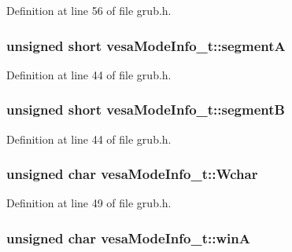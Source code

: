 Definition at line 56 of file grub.\+h.

\hypertarget{structvesaModeInfo__t_af83d59348e11c50399f088cea83fb0a9}{
\subsubsection[{segment\+A}]{\setlength{\rightskip}{0pt plus 5cm}unsigned short vesa\+Mode\+Info\+\_\+t\+::segment\+A}}\label{structvesaModeInfo__t_af83d59348e11c50399f088cea83fb0a9}


Definition at line 44 of file grub.\+h.

\hypertarget{structvesaModeInfo__t_a3f8f6fe3c4ee7fdbca2cf15883db343f}{
\subsubsection[{segment\+B}]{\setlength{\rightskip}{0pt plus 5cm}unsigned short vesa\+Mode\+Info\+\_\+t\+::segment\+B}}\label{structvesaModeInfo__t_a3f8f6fe3c4ee7fdbca2cf15883db343f}


Definition at line 44 of file grub.\+h.

\hypertarget{structvesaModeInfo__t_a154546a781d9a7d5da7cc0b77a7b998c}{
\subsubsection[{Wchar}]{\setlength{\rightskip}{0pt plus 5cm}unsigned char vesa\+Mode\+Info\+\_\+t\+::\+Wchar}}\label{structvesaModeInfo__t_a154546a781d9a7d5da7cc0b77a7b998c}


Definition at line 49 of file grub.\+h.

\hypertarget{structvesaModeInfo__t_ac056f64b4375a72439ae6e84aae88e7f}{
\subsubsection[{win\+A}]{\setlength{\rightskip}{0pt plus 5cm}unsigned char vesa\+Mode\+Info\+\_\+t\+::win\+A}}\label{structvesaModeInfo__t_ac056f64b4375a72439ae6e84aae88e7f}


